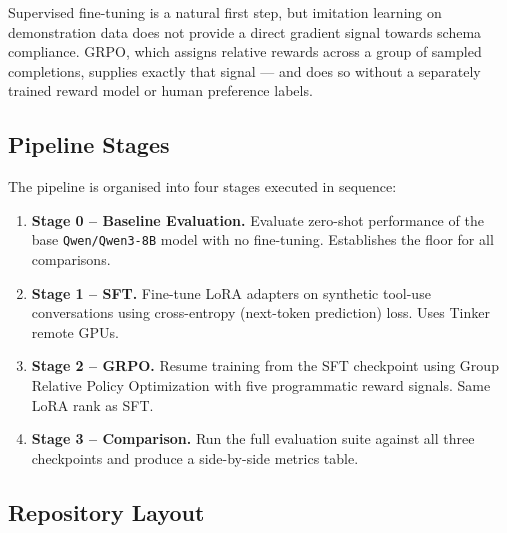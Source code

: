 \documentclass[12pt, a4paper]{article}
\begin{document}
Supervised fine-tuning is a natural first step, but imitation learning on
demonstration data does not provide a direct gradient signal towards schema
compliance. GRPO, which assigns relative rewards across a group of sampled
completions, supplies exactly that signal --- and does so without a separately
trained reward model or human preference labels.

\subsection{Pipeline Stages}

The pipeline is organised into four stages executed in sequence:

\begin{enumerate}[leftmargin=1.5em, itemsep=5pt]
  \item \textbf{Stage 0 -- Baseline Evaluation.}
    Evaluate zero-shot performance of the base \texttt{Qwen/Qwen3-8B} model
    with no fine-tuning. Establishes the floor for all comparisons.
  \item \textbf{Stage 1 -- SFT.}
    Fine-tune LoRA adapters on synthetic tool-use conversations using
    cross-entropy (next-token prediction) loss. Uses Tinker remote GPUs.
  \item \textbf{Stage 2 -- GRPO.}
    Resume training from the SFT checkpoint using Group Relative Policy
    Optimization with five programmatic reward signals. Same LoRA rank as SFT.
  \item \textbf{Stage 3 -- Comparison.}
    Run the full evaluation suite against all three checkpoints and produce
    a side-by-side metrics table.
\end{enumerate}

\subsection{Repository Layout}
\end{document}
